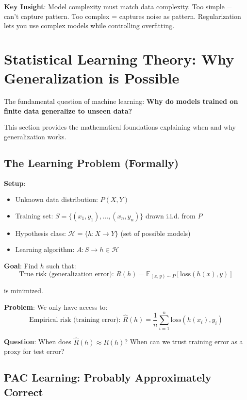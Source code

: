 \documentclass[11pt,oneside]{book}
\begin{document}
\begin{insightbox}
\textbf{Key Insight}: Model complexity must match data complexity. Too simple = can't capture pattern. Too complex = captures noise as pattern. Regularization lets you use complex models while controlling overfitting.
\end{insightbox}

\section{Statistical Learning Theory: Why Generalization is Possible}

The fundamental question of machine learning: \textbf{Why do models trained on finite data generalize to unseen data?}

This section provides the mathematical foundations explaining when and why generalization works.

\subsection{The Learning Problem (Formally)}

\textbf{Setup}:
\begin{itemize}
    \item Unknown data distribution: $P(X, Y)$
    \item Training set: $S = \{(x_1, y_1), \ldots, (x_n, y_n)\}$ drawn i.i.d. from $P$
    \item Hypothesis class: $\mathcal{H} = \{h: X \to Y\}$ (set of possible models)
    \item Learning algorithm: $A: S \to h \in \mathcal{H}$
\end{itemize}

\textbf{Goal}: Find $h$ such that:
\begin{equation}
\text{True risk (generalization error): } R(h) = \mathbb{E}_{(x,y)\sim P}[\text{loss}(h(x), y)]
\end{equation}

is minimized.

\textbf{Problem}: We only have access to:
\begin{equation}
\text{Empirical risk (training error): } \hat{R}(h) = \frac{1}{n} \sum_{i=1}^{n} \text{loss}(h(x_i), y_i)
\end{equation}

\textbf{Question}: When does $\hat{R}(h) \approx R(h)$? When can we trust training error as a proxy for test error?

\subsection{PAC Learning: Probably Approximately Correct}
\end{document}
